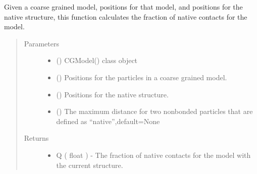 \documentclass[letterpaper,12pt,english,openany,oneside]{sphinxmanual}
\begin{document}
\begin{fulllineitems}
\label{\detokenize{parameters:parameters.secondary_structure.fraction_native_contacts}}
Given a coarse grained model, positions for that model, and positions for the native structure, this function calculates the fraction of native contacts for the model.
\begin{quote}\begin{description}
\item[{Parameters}] \leavevmode\begin{itemize}
\item {} 
 () \textendash{} CGModel() class object

\item {} 
 (\sphinxstyleliteralemphasis{\sphinxupquote{( }}\sphinxstyleliteralemphasis{\sphinxupquote{ ( }}\sphinxstyleliteralemphasis{\sphinxupquote{ ) }}\sphinxstyleliteralemphasis{\sphinxupquote{)}}) \textendash{} Positions for the particles in a coarse grained model.

\item {} 
 (\sphinxstyleliteralemphasis{\sphinxupquote{( }}\sphinxstyleliteralemphasis{\sphinxupquote{ ( }}\sphinxstyleliteralemphasis{\sphinxupquote{ ) }}\sphinxstyleliteralemphasis{\sphinxupquote{)}}) \textendash{} Positions for the native structure.

\item {} 
 () \textendash{} The maximum distance for two nonbonded particles that are defined as “native”,default=None

\end{itemize}

\item[{Returns}] \leavevmode
\begin{itemize}
\item {} 
Q ( float ) - The fraction of native contacts for the model with the current structure.

\end{itemize}


\end{description}\end{quote}

\end{fulllineitems}
\end{document}
